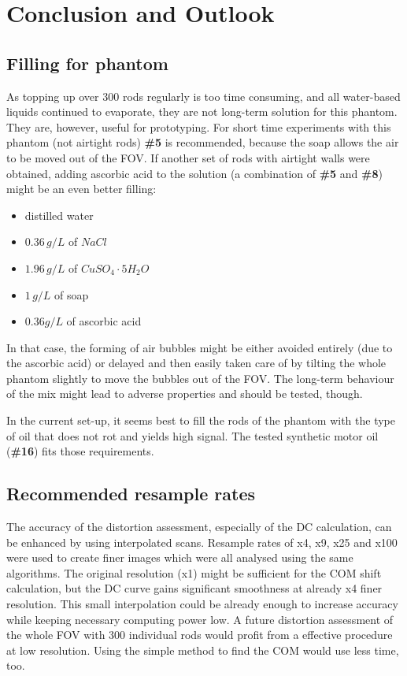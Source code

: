 
\chapter{Conclusion and Outlook}
\section{Filling for phantom}

As topping up over 300 rods regularly is too time consuming, and all water-based liquids continued to evaporate, they are not long-term solution for this phantom.
They are, however, useful for prototyping.
For short time experiments with this phantom (not airtight rods) \textbf{\#5} is recommended, because the soap allows the air to be moved out of the FOV.
If another set of rods with airtight walls were obtained, adding ascorbic acid to the solution (a combination of \textbf{\#5} and \textbf{\#8}) might be an even better filling:
\begin{itemize}
\item  distilled water
\item  $0.36 \, g/L$ of $NaCl$
\item  $1.96 \, g/L$ of $CuSO_4\cdot5H_2O$
\item  $1 \, g/L$ of soap
\item  $0.36 g/L$ of ascorbic acid
\end{itemize}
In that case, the forming of air bubbles might be either avoided entirely (due to the ascorbic acid) or delayed and then easily taken care of by tilting the whole phantom slightly to move the bubbles out of the FOV.
The long-term behaviour of the mix might lead to adverse properties and should be tested, though.

In the current set-up, it seems best to fill the rods of the phantom with the type of oil that does not rot and yields high signal.
The tested synthetic motor oil (\textbf{\#16}) fits those requirements.

\section{Recommended resample rates}

The accuracy of the distortion assessment, especially of the DC calculation, can be enhanced by using interpolated scans.
Resample rates of x4, x9, x25 and x100 were used to create finer images which were all analysed using the same algorithms.
The original resolution (x1) might be sufficient for the COM shift calculation, but the DC curve gains significant smoothness at already x4 finer resolution.
This small interpolation could be already enough to increase accuracy while keeping necessary computing power low.
A future distortion assessment of the whole FOV with 300 individual rods would profit from a effective procedure at low resolution.
Using the simple method to find the COM would use less time, too.

